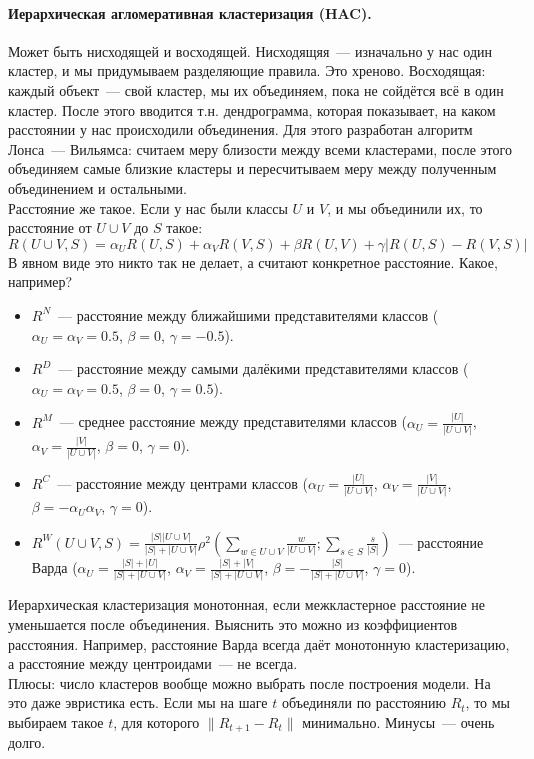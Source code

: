 \documentclass{article}
\begin{document}
    \paragraph{Иерархическая агломеративная кластеризация (HAC).}
    Может быть нисходящей и восходящей. Нисходящяя~--- изначально у нас один кластер, и мы придумываем разделяющие правила. Это хреново. Восходящая: каждый объект~--- свой кластер, мы их объединяем, пока не сойдётся всё в один кластер. После этого вводится т.н. дендрограмма, которая показывает, на каком расстоянии у нас происходили объединения. Для этого разработан алгоритм Лонса~--- Вильямса: считаем меру близости между всеми кластерами, после этого объединяем самые близкие кластеры и пересчитываем меру между полученным объединением и остальными.\\
    Расстояние же такое. Если у нас были классы $U$ и $V$, и мы объединили их, то расстояние от $U\cup V$ до $S$ такое:
    \[
    R(U\cup V,S)=\alpha_UR(U,S)+\alpha_VR(V,S)+\beta R(U,V)+\gamma|R(U,S)-R(V,S)|
    \]
    В явном виде это никто так не делает, а считают конкретное расстояние. Какое, например?
    \begin{itemize}
        \item $R^N$~--- расстояние между ближайшими представителями классов ($\alpha_U=\alpha_V=0.5$, $\beta=0$, $\gamma=-0.5$).
        \item $R^D$~--- расстояние между самыми далёкими представителями классов ($\alpha_U=\alpha_V=0.5$, $\beta=0$, $\gamma=0.5$).
        \item $R^M$~--- среднее расстояние между представителями классов ($\alpha_U=\frac{|U|}{|U\cup V|}$, $\alpha_V=\frac{|V|}{|U\cup V|}$, $\beta=0$, $\gamma=0$).
        \item $R^C$~--- расстояние между центрами классов ($\alpha_U=\frac{|U|}{|U\cup V|}$, $\alpha_V=\frac{|V|}{|U\cup V|}$, $\beta=-\alpha_U\alpha_V$, $\gamma=0$).
        \item $R^W(U\cup V,S)=\frac{|S||U\cup V|}{|S|+|U\cup V|}\rho^2\left(\sum\limits_{w\in U\cup V}\frac w{|U\cup V|};\sum\limits_{s\in S}\frac s{|S|}\right)$~--- расстояние Варда ($\alpha_U=\frac{|S|+|U|}{|S|+|U\cup V|}$, $\alpha_V=\frac{|S|+|V|}{|S|+|U\cup V|}$, $\beta=-\frac{|S|}{|S|+|U\cup V|}$, $\gamma=0$).
    \end{itemize}
    Иерархическая кластеризация монотонная, если межкластерное расстояние не уменьшается после объединения. Выяснить это можно из коэффициентов расстояния. Например, расстояние Варда всегда даёт монотонную кластеризацию, а расстояние между центроидами~--- не всегда.\\
    Плюсы: число кластеров вообще можно выбрать после построения модели. На это даже эвристика есть. Если мы на шаге $t$ объединяли по расстоянию $R_{t}$, то мы выбираем такое $t$, для которого $\|R_{t+1}-R_t\|$ минимально. Минусы~--- очень долго.
\end{document}
